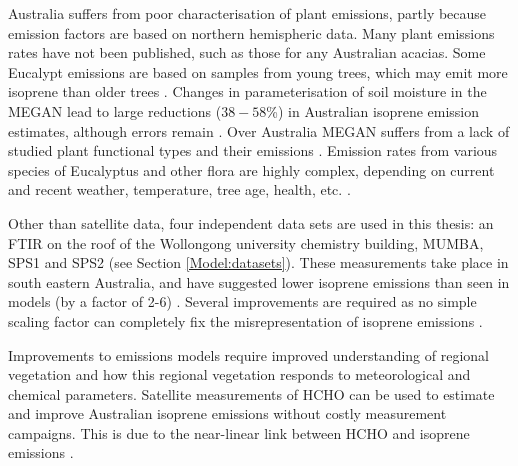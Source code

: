     
    Australia suffers from poor characterisation of plant emissions, partly because emission factors are based on northern hemispheric data.
    Many plant emissions rates have not been published, such as those for any Australian acacias.
    Some Eucalypt emissions are based on samples from young trees, which may emit more isoprene than older trees \parencite{Emmerson2016}.
    Changes in parameterisation of soil moisture in the MEGAN lead to large reductions ($38-58$\%) in Australian isoprene emission estimates, although errors remain \parencite{Sindelarova2014, Emmerson2019}.
    Over Australia MEGAN suffers from a lack of studied plant functional types and their emissions \parencite[eg.][]{Muller2008}.
    Emission rates from various species of Eucalyptus and other flora are highly complex, depending on current and recent weather, temperature, tree age, health, etc. \parencite{Guenther2012}. 
       
    Other than satellite data, four independent data sets are used in this thesis: an FTIR on the roof of the Wollongong university chemistry building, MUMBA, SPS1 and SPS2 (see Section \ref{Model:datasets}).
    These measurements take place in south eastern Australia, and have suggested lower isoprene emissions than seen in models (by a factor of 2-6) \parencite{Emmerson2016}.
    Several improvements are required as no simple scaling factor can completely fix the misrepresentation of isoprene emissions \parencite{Emmerson2016}.
    
    
    Improvements to emissions models require improved understanding of regional vegetation and how this regional vegetation responds to meteorological and chemical parameters.
    Satellite measurements of HCHO can be used to estimate and improve Australian isoprene emissions without costly measurement campaigns.
    This is due to the near-linear link between HCHO and isoprene emissions \parencite[e.g.,][]{Palmer2001, Millet2006, Bauwens2016}.
    
